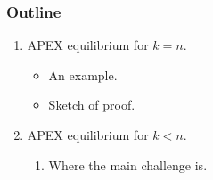 \documentclass[9pt]{beamer}
\begin{document}
\begin{frame}
\frametitle{Outline}

\begin{enumerate}

\item APEX equilibrium for $k=n$.
\begin{itemize}
\item An example.
\item Sketch of proof.
\end{itemize}
\item APEX equilibrium for $k<n$.
\begin{enumerate}
\item Where the main challenge is.
\end{enumerate}
\end{enumerate}


\end{frame}


\end{document}
